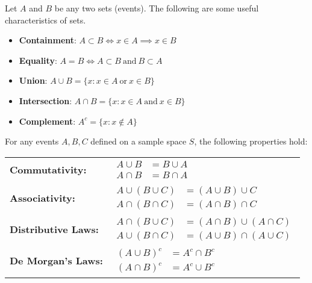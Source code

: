 \begin{properties}
    Let $A$ and $B$ be any two sets (events). The following are some useful characteristics of sets.
    \begin{itemize}
        \item \textbf{Containment}: $A \subset B \iff x \in A \implies x \in B$
        \item \textbf{Equality}: $A = B \iff A \subset B \mathrm{\ and\ } B \subset A$
        \item \textbf{Union}: $A \cup B = \{x: x \in A \mathrm{\ or\ } x \in B\}$
        \item \textbf{Intersection}: $A \cap B = \{x: x \in A \mathrm{\ and\ } x \in B\}$
        \item \textbf{Complement}: $A^c = \{x: x \notin A\}$
    \end{itemize}
\end{properties}

\begin{theorem}
    For any events $A, B, C$ defined on a sample space $S$, the following properties hold: \\
    \begin{center}
    \begin{tabular}{@{} l l}
        \textbf{Commutativity:} &
        $\begin{aligned}
            A \cup B &= B \cup A \\
            A \cap B &= B \cap A
        \end{aligned}$ \\[3ex]
    
        \textbf{Associativity:} &
        $\begin{aligned}
            A \cup (B \cup C) &= (A \cup B) \cup C \\
            A \cap (B \cap C) &= (A \cap B) \cap C
        \end{aligned}$ \\[3ex]
    
        \textbf{Distributive Laws:} &
        $\begin{aligned}
            A \cap (B \cup C) &= (A \cap B) \cup (A \cap C) \\
            A \cup (B \cap C) &= (A \cup B) \cap (A \cup C)
        \end{aligned}$ \\[3ex]
    
        \textbf{De Morgan's Laws:} &
        $\begin{aligned}
            (A \cup B)^c &= A^c \cap B^c \\
            (A \cap B)^c &= A^c \cup B^c
        \end{aligned}$
    \end{tabular}
    \end{center}
\end{theorem}


